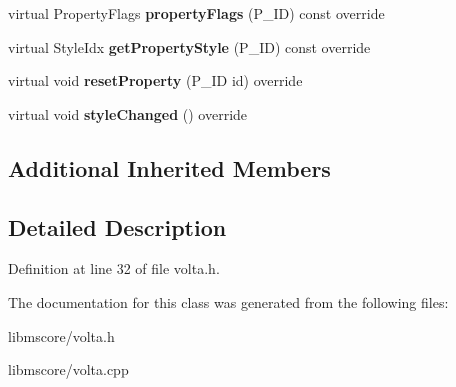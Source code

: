 \begin{DoxyCompactItemize}
virtual Property\+Flags {\bfseries property\+Flags} (P\+\_\+\+ID) const override
\item 
\mbox{\label{class_ms_1_1_volta_segment_aeacd7605ce573589bbcba76a62673639}} 
virtual Style\+Idx {\bfseries get\+Property\+Style} (P\+\_\+\+ID) const override
\item 
\mbox{\label{class_ms_1_1_volta_segment_a9529a934be30cad141fe6567672bfaea}} 
virtual void {\bfseries reset\+Property} (P\+\_\+\+ID id) override
\item 
\mbox{\label{class_ms_1_1_volta_segment_a114c8318b811934516f82e355619c422}} 
virtual void {\bfseries style\+Changed} () override
\end{DoxyCompactItemize}
\subsection*{Additional Inherited Members}


\subsection{Detailed Description}


Definition at line 32 of file volta.\+h.



The documentation for this class was generated from the following files\+:\begin{DoxyCompactItemize}
\item 
libmscore/volta.\+h\item 
libmscore/volta.\+cpp\end{DoxyCompactItemize}
